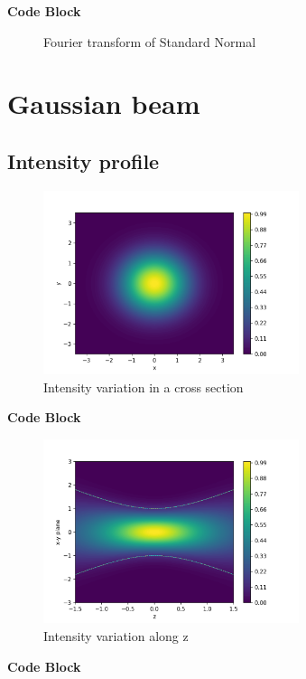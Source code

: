 \documentclass[11pt,a4paper]{article}
\begin{document}
\noindent \dotfill \textbf{Code Block} \noindent\dotfill

\dotfill

\begin{figure}[ht]
	\centering
	\scalebox{1}{}
	\caption{Fourier transform of Standard Normal}
	\label{fig:fft_gaussian}
\end{figure}

\section{Gaussian beam}

\subsection{Intensity profile}
\begin{figure}[ht]
	\centering
	\includegraphics[width=7.5cm]{intensity.png}
	\caption{Intensity variation in a cross section}
	\label{fig:intensity}
\end{figure}

\noindent \dotfill \textbf{Code Block} \noindent\dotfill

\dotfill

\begin{figure}[ht]
	\centering
	\includegraphics[width=7.5cm]{intensity_var.png}
	\caption{Intensity variation along z}
	\label{fig:intensity_var}
\end{figure}

\noindent \dotfill \textbf{Code Block} \noindent\dotfill

\dotfill
\end{document}
